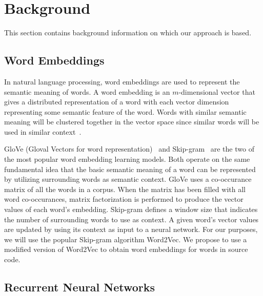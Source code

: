 \section{Background}

This section contains background information on which our approach is based.

\subsection{Word Embeddings}

In natural language processing, word embeddings are used to represent the semantic meaning of words. A word embedding is an $m$-dimensional vector that gives a distributed representation of a word with each vector dimension representing some semantic feature of the word. Words with similar semantic meaning will be clustered together in the vector space since similar words will be used in similar context~\cite{mikolov2013distributed}.

GloVe (Gloval Vectors for word representation)~\cite{pennington2014glove} and Skip-gram~\cite{mikolov2013efficient} are the two of the most popular word embedding learning models. Both operate on the same fundamental idea that the basic semantic meaning of a word can be represented by utilizing surrounding words as semantic context. GloVe uses a co-occurance matrix of all the words in a corpus. When the matrix has been filled with all word co-occurances, matrix factorization is performed to produce the vector values of each word's embedding. Skip-gram defines a window size that indicates the number of surrounding words to use as context. A given word's vector values are updated by using its context as input to a neural network. For our purposes, we will use the popular Skip-gram algorithm Word2Vec. We propose to use a modified version of Word2Vec to obtain word embeddings for words in source code. 


 
\subsection{Recurrent Neural Networks}

